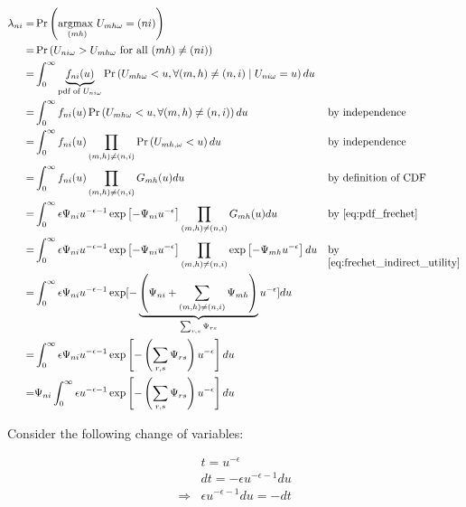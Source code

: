 \documentclass[10pt]{article}
\begin{document}
\begin{align}
    \lambda_{ni} = &\Pr\left( \underset{(mh)}{\text{argmax }} U_{m h \omega} = (ni) \right) \\
    = &\Pr\left( U_{n i \omega} > U_{m h \omega} \text{ for all } (m h) \neq (n i) \right) \\
    = & \int_0^{\infty} \underbrace{f_{n i}(u)}_{\text {pdf of } U_{n i \omega}} \operatorname{Pr}\left(U_{m h \omega}<u, \forall(m, h) \neq(n, i) \mid U_{n i \omega}=u\right) d u \\
    = & \int_0^{\infty} f_{n i}(u) \operatorname{Pr}\left(U_{m h \omega}<u, \forall(m, h) \neq(n, i) \right) d u && \parbox[t]{4cm}{\raggedright by independence} \\
    = & \int_0^{\infty} f_{n i}(u) \prod_{(m, h) \neq(n, i)} \operatorname{Pr}\left(U_{m h, \omega}<u\right) d u && \parbox[t]{4cm}{\raggedright by independence} \\
    = & \int_0^{\infty} f_{n i}(u) \prod_{(m, h) \neq(n, i)} G_{m h}(u) d u && \parbox[t]{4cm}{\raggedright by definition of CDF} \\
    = & \int_0^{\infty} \epsilon \Psi_{n i} u^{-\epsilon-1} \exp \left[-\Psi_{n i} u^{-\epsilon}\right] \prod_{(m, h) \neq(n, i)} G_{m h}(u) d u && \parbox[t]{4cm}{\raggedright by \eqref{eq:pdf_frechet}} \\
    = & \int_0^{\infty} \epsilon \Psi_{n i} u^{-\epsilon-1} \exp \left[-\Psi_{n i} u^{-\epsilon}\right] \prod_{(m, h) \neq(n, i)} \exp \left[-\Psi_{m h} u^{-\epsilon}\right] d u && \parbox[t]{4cm}{\raggedright by \eqref{eq:frechet_indirect_utility}} \\
    = &\int_0^{\infty} \epsilon \Psi_{n i} u^{-\epsilon-1} \exp [-\underbrace{\left(\Psi_{n i}+\sum_{(m, h) \neq(n, i)} \Psi_{m h}\right)}_{\sum_{r, s} \Psi_{r s}} u^{-\epsilon}] d u \\
    = &\int_0^{\infty} \epsilon \Psi_{n i} u^{-\epsilon-1} \exp \left[-\left(\sum_{r, s} \Psi_{r s}\right) u^{-\epsilon}\right] d u \\
    = &\Psi_{n i} \int_0^{\infty} \epsilon u^{-\epsilon-1} \exp \left[-\left(\sum_{r, s} \Psi_{r s}\right) u^{-\epsilon}\right] d u
\end{align}

Consider the following change of variables:

\begin{align}
    &t = u^{-\epsilon} \\
    &dt = -\epsilon u^{-\epsilon-1} du \\
    \Rightarrow &\epsilon u^{-\epsilon-1} d u=-d t
\end{align}
\end{document}
